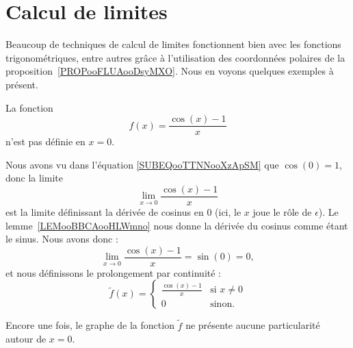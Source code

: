 

\section{Calcul de limites}

Beaucoup de techniques de calcul de limites fonctionnent bien avec les fonctions trigonométriques, entre autres grâce à l'utilisation des coordonnées polaires de la proposition~\ref{PROPooFLUAooDsyMXO}. Nous en voyons quelques exemples à présent.

\begin{example} \label{ExQWHooGddTLE}
	La fonction
	\begin{equation}
		f(x)=\frac{ \cos(x)-1 }{ x }
	\end{equation}
	n'est pas définie en \( x=0\).

	Nous avons vu dans l'équation \eqref{SUBEQooTTNNooXzApSM} que \( \cos(0)=1\), donc la limite
	\begin{equation}
		\lim_{x\to 0} \frac{ \cos(x)-1 }{ x }
	\end{equation}
	est la limite définissant la dérivée de cosinus en \( 0\) (ici, le \( x\) joue le rôle de \( \epsilon\)). Le lemme~\ref{LEMooBBCAooHLWmno} nous donne la dérivée du cosinus comme étant le sinus. Nous avons donc :
	\begin{equation}
		\lim_{x\to 0} \frac{ \cos(x)-1 }{ x }=\sin(0)=0,
	\end{equation}
	et nous définissons le prolongement par continuité :
	\begin{equation}
		\tilde f(x)=\begin{cases}
			\frac{ \cos(x)-1 }{ x } & \text{si } x\neq 0 \\
			0                       & \text{sinon}.
		\end{cases}
	\end{equation}

	Encore une fois, le graphe de la fonction \(\tilde f\) ne présente aucune particularité autour de \( x=0\).
	\begin{center}
		
	\end{center}
\end{example}

